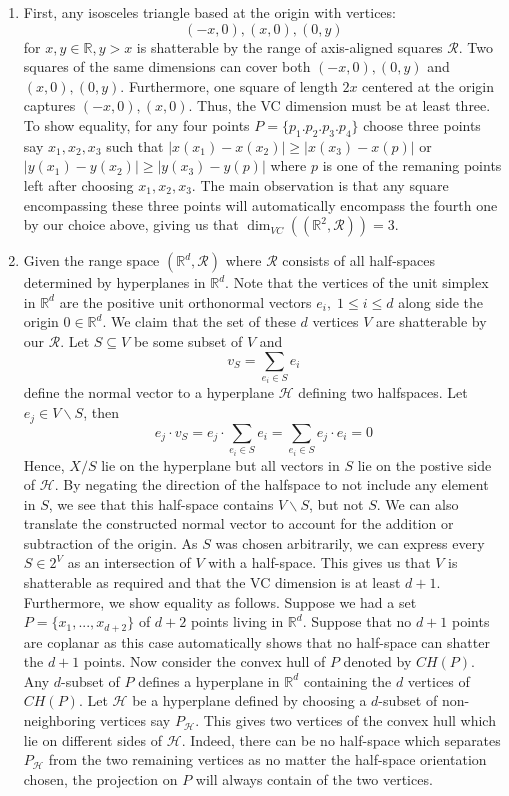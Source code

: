 \documentclass[12pt]{article}%
\begin{document}
\begin{enumerate}
  \item First, any isosceles triangle based at the origin with vertices:
  $$(-x,0),(x,0),(0,y)$$ for $x,y \in \mathbb{R}, y > x$ is shatterable by the range of axis-aligned squares $\mathcal{R}$. Two squares of the same dimensions can cover both $(-x,0),(0,y)$ and $(x,0),(0,y)$. Furthermore, one square of length $2x$ centered at the origin captures $(-x,0), (x,0)$. Thus, the VC dimension must be at least three. \newline \newline
  To show equality, for any four points $P = \{p_1.p_2.p_3.p_4\}$ choose three points say $x_1,x_2,x_3$ such that $|x(x_1) - x(x_2)| \geq |x(x_3) - x(p)|$ or $|y(x_1) - y(x_2)| \geq |y(x_3) - y(p)|$ where $p$ is one of the remaning points left after choosing $x_1,x_2,x_3$. The main observation is that any square encompassing these three points will automatically encompass the fourth one by our choice above, giving us that $\dim_{VC}((\mathbb{R}^2,\mathcal{R})) = 3$.

  \item Given the range space $(\mathbb{R}^{d},\mathcal{R})$ where $\mathcal{R}$ consists of all half-spaces determined by hyperplanes in $\mathbb{R}^{d}$. Note that the vertices of the unit simplex in $\mathbb{R}^{d}$
  are the positive unit orthonormal vectors $e_i, \; 1 \leq i \leq d$ along side the origin $0 \in \mathbb{R}^d$. We claim that the set of these $d$ vertices $V$ are shatterable by our $\mathcal{R}$. Let $S \subseteq V $ be some subset of $V$ and
  $$ v_S = \sum_{e_i \in S} e_i $$ define the normal vector to a hyperplane $\mathcal{H}$ defining two halfspaces. Let $e_j \in V \backslash S$, then
  $$ e_j \cdot v_S = e_j \cdot \sum_{e_i \in S} e_i = \sum_{e_i \in S} e_j\cdot e_i  = 0$$ Hence, $X/S$ lie on the hyperplane but all vectors in $S$ lie on the postive side of $\mathcal{H}$. By negating the direction of the halfspace to not include any element in $S$, we see that this half-space contains $V\backslash S$, but not $S$. We can also translate the constructed normal vector to account for the addition or subtraction of the origin. As $S$ was chosen arbitrarily, we can express every $S \in 2^V$ as an intersection of $V$ with a half-space. This gives us that $V$ is shatterable as required and that the VC dimension is at least $d+1$. \newline \newline
  Furthermore, we show equality as follows.
  Suppose we had a set $P = \{x_1,...,x_{d+2}\}$ of $d+2$ points living in $\mathbb{R}^d$. Suppose that no $d+1$ points are coplanar as this case automatically shows that no half-space can shatter the $d+1$ points. Now consider the convex hull of $P$ denoted by $CH(P)$. Any $d$-subset of $P$ defines a hyperplane in $\mathbb{R}^d$ containing the $d$ vertices of $CH(P)$. Let $\mathcal{H}$ be a hyperplane defined by choosing a $d$-subset of non-neighboring vertices say $P_{\mathcal{H}}$. This gives two vertices of the convex hull which lie on different sides of $\mathcal{H}$. Indeed, there can be no half-space which separates $P_{\mathcal{H}}$ from the two remaining vertices as no matter the half-space orientation chosen, the projection on $P$ will always contain of the two vertices.


\end{enumerate}
\end{document}
